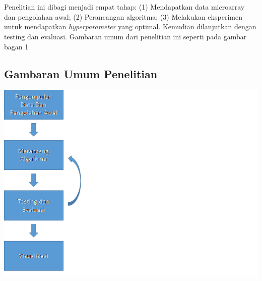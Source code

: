 \chapter{\babTiga}

Penelitian ini dibagi menjadi empat tahap: (1) Mendapatkan data microarray dan pengolahan awal; (2) Perancangan algoritma; (3) Melakukan eksperimen untuk mendapatkan \textit{hyperparameter} yang optimal. Kemudian dilanjutkan dengan  testing dan evaluasi. Gambaran umum dari penelitian ini seperti pada gambar bagan 1


\section{Gambaran Umum Penelitian}

\includegraphics[scale=1]{pics/gbr3_1.png} 



